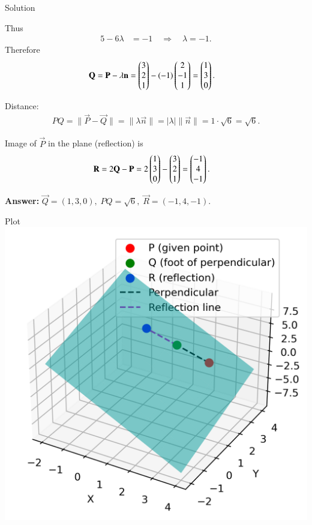 \documentclass{beamer}
\begin{document}
\begin{frame}{Solution}

Thus
\begin{align}
5 - 6\lambda &= -1 \quad\Rightarrow\quad \lambda = -1.
\end{align}
Therefore
\begin{align}
\mathbf{Q} &= \mathbf{P}-\lambda\mathbf{n} = \begin{pmatrix}3\\2\\1\end{pmatrix} - (-1)\begin{pmatrix}2\\-1\\1\end{pmatrix}
= \begin{pmatrix}1\\3\\0\end{pmatrix}.
\end{align}

Distance:
\begin{align}
PQ = \|\vec{P}-\vec{Q}\| = \|\lambda\vec{n}\| = |\lambda|\|\vec{n}\| = 1\cdot\sqrt{6}=\sqrt{6}.
\end{align}

Image of $\vec{P}$ in the plane (reflection) is
\begin{align}
\mathbf{R} &= 2\mathbf{Q} - \mathbf{P} = 2\begin{pmatrix}1\\3\\0\end{pmatrix} - \begin{pmatrix}3\\2\\1\end{pmatrix} = \begin{pmatrix}-1\\4\\-1\end{pmatrix}.
\end{align}

\bigskip
\noindent\textbf{Answer:} \(
\vec{Q}=(1,3,0),\; PQ=\sqrt{6},\; \vec{R}=(-1,4,-1).
\)
\end{frame}
\begin{frame}{Plot}
    \centering
    \includegraphics[width=\columnwidth, height=0.8\textheight, keepaspectratio]{../figs/point_plane.png}     
\end{frame}
\end{document}
